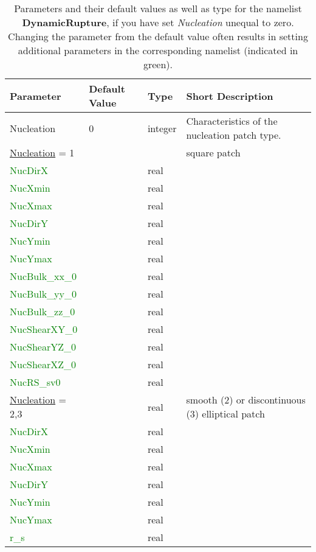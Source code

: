 \documentclass[12pt,twoside]{article}
\begin{document}
\begin{table}[H]
\caption{Parameters and their default values as well as type for the namelist \textbf{DynamicRupture}, 
         if you have set \textit{Nucleation} unequal to zero.
         Changing the parameter from the default value often results in setting additional parameters 
         in the corresponding namelist (indicated in green).}
\begin{center}
\begin{tabular}{|p{4.8cm}|p{2.4cm}|p{2cm}|p{5cm}|}
\hline
Parameter & Default Value & Type & Short Description \\
\hline
\hline
Nucleation & 0 & integer & Characteristics of the nucleation patch type.\\
\hline
\uline{Nucleation} = 1 & & & square patch\\
\hdashline
\textcolor{green}{NucDirX} & & real & \\
\textcolor{green}{NucXmin} & & real & \\
\textcolor{green}{NucXmax} & & real & \\
\textcolor{green}{NucDirY} & & real & \\
\textcolor{green}{NucYmin} & & real & \\
\textcolor{green}{NucYmax} & & real & \\
\textcolor{green}{NucBulk\_xx\_0} & & real & \\
\textcolor{green}{NucBulk\_yy\_0} & & real & \\
\textcolor{green}{NucBulk\_zz\_0} & & real & \\
\textcolor{green}{NucShearXY\_0} & & real & \\
\textcolor{green}{NucShearYZ\_0} & & real & \\
\textcolor{green}{NucShearXZ\_0} & & real & \\
\textcolor{green}{NucRS\_sv0} & & real & \\
\hline
\uline{Nucleation} = 2,3 & & real & smooth (2) or discontinuous (3) elliptical patch\\
\textcolor{green}{NucDirX} & & real & \\
\textcolor{green}{NucXmin} & & real & \\
\textcolor{green}{NucXmax} & & real & \\
\textcolor{green}{NucDirY} & & real & \\
\textcolor{green}{NucYmin} & & real & \\
\textcolor{green}{NucYmax} & & real & \\
\textcolor{green}{r\_s} & & real & \\

\end{tabular}
\end{center}
\end{table}
\end{document}
